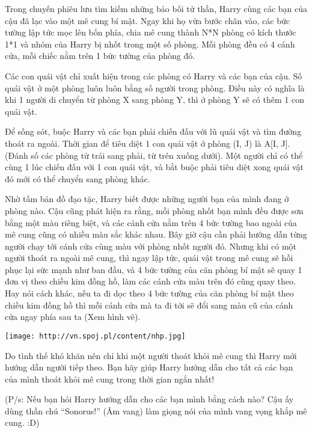 Trong chuyến phiêu lưu tìm kiếm những bảo bối tử thần, Harry cùng các bạn của cậu đã lạc vào một mê cung bí mật. Ngay khi họ vừa bước chân vào, các bức tường lập tức mọc lên bốn phía, chia mê cung thành N*N phòng có kích thước 1*1 và nhóm của Harry bị nhốt trong một số phòng. Mỗi phòng đều có 4 cánh cửa, mỗi chiếc nằm trên 1 bức tường của phòng đó.

Các con quái vật chỉ xuất hiện trong các phòng có Harry và các bạn của cậu. Số quái vật ở một phòng luôn luôn bằng số người trong phòng. Điều này có nghĩa là khi 1 người di chuyển từ phòng X sang phòng Y, thì ở phòng Y sẽ có thêm 1 con quái vật.

Để sống sót, buộc Harry và các bạn phải chiến đấu với lũ quái vật và tìm đường thoát ra ngoài. Thời gian để tiêu diệt 1 con quái vật ở phòng (I, J) là A[I, J]. (Đánh số các phòng từ trái sang phải, từ trên xuống dưới). Một người chỉ có thể cùng 1 lúc chiến đấu với 1 con quái vật, và bắt buộc phải tiêu diệt xong quái vật đó mới có thể chuyển sang phòng khác.

Nhờ tấm bản đồ đạo tặc, Harry biết được những người bạn của mình đang ở phòng nào. Cậu cũng phát hiện ra rằng, mỗi phòng nhốt bạn mình đều được sơn bằng một màu riêng biệt, và các cánh cửa nằm trên 4 bức tường bao ngoài của mê cung cũng có nhiều màu sắc khác nhau. Bây giờ cậu cần phải hướng dẫn từng người chạy tới cánh cửa cùng màu với phòng nhốt người đó. Nhưng khi có một người thoát ra ngoài mê cung, thì ngay lập tức, quái vật trong mê cung sẽ hồi phục lại sức mạnh như ban đầu, và 4 bức tường của căn phòng bí mật sẽ quay 1 đơn vị theo chiều kim đồng hồ, làm các cánh cửa màu trên đó cũng quay theo. Hay nói cách khác, nếu ta đi dọc theo 4 bức tường của căn phòng bí mật theo chiều kim đồng hồ thì mỗi cánh cửa mà ta đi tới sẽ đổi sang màu cũ của cánh cửa ngay phía sau ta (Xem hình vẽ).


\texttt{[image: http://vn.spoj.pl/content/nhp.jpg]}

Do tình thế khó khăn nên chỉ khi một người thoát khỏi mê cung thì Harry mới hướng dẫn người tiếp theo. Bạn hãy giúp Harry hướng dẫn cho tất cả các bạn của mình thoát khỏi mê cung trong thời gian ngắn nhất!

(P/s: Nếu bạn hỏi Harry hướng dẫn cho các bạn mình bằng cách nào? Cậu ấy dùng thần chú “Sonorus!” (Âm vang) làm giọng nói của mình vang vọng khắp mê cung. :D)